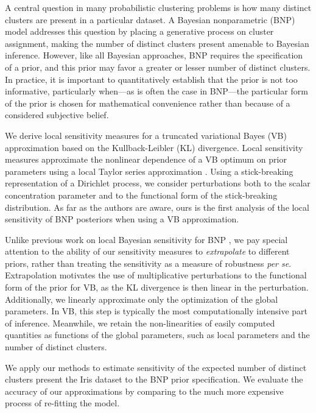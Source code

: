 
A central question in many probabilistic clustering problems is how many
distinct clusters are present in a particular dataset. A Bayesian nonparametric
(BNP) model addresses this question by placing a generative process on cluster
assignment, making the number of distinct clusters present amenable to Bayesian
inference.  However, like all Bayesian approaches, BNP requires the
specification of a prior, and this prior may favor a greater or lesser number of
distinct clusters. In practice, it is important to quantitatively establish that
the prior is not too informative, particularly when---as is often the case in
BNP---the particular form of the prior is chosen for mathematical convenience
rather than because of a considered subjective belief.

We derive local sensitivity measures for a truncated variational Bayes (VB)
approximation based on the Kullback-Leibler (KL) divergence. Local sensitivity
measures approximate the nonlinear dependence of a VB optimum on prior
parameters using a local Taylor series approximation
\citep{gustafson:1996:localposterior, giordano:2017:covariances}. Using a
stick-breaking representation of a Dirichlet process, we consider perturbations
both to the scalar concentration parameter and to the functional form of the
stick-breaking distribution. As far as the authors are aware, ours is the first
analysis of the local sensitivity of BNP posteriors when using a VB
approximation.

Unlike previous work on local Bayesian sensitivity for BNP
\citep{Basu:2000:BNP_robustness}, we pay special attention to the ability of our
sensitivity measures to \emph{extrapolate} to different priors, rather than
treating the sensitivity as a measure of robustness \textit{per se}.
Extrapolation motivates the use of multiplicative perturbations to the
functional form of the prior for VB, as the KL divergence is then linear in the
perturbation. Additionally, we linearly approximate only the optimization of
the global parameters. In VB, this step is typically the most computationally
intensive part of inference. Meanwhile, we retain the non-linearities of easily computed
quantities as functions of the global parameters, such as local parameters 
and the number of distinct clusters.



We apply our methods to estimate sensitivity of the expected number of distinct
clusters present the Iris dataset \citep{iris_data_anderson, iris_data_fisher}
to the BNP prior specification.  We evaluate the accuracy of our approximations
by comparing to the much more expensive process of re-fitting the model.
